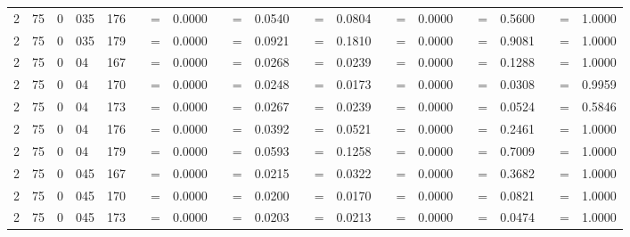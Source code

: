 \begin{tabular*}{260mm}{r@{.}lr@{.}lc|ccc:ccc:ccc:ccc:ccc|ccc}
		2&75	&	0&035	&	176	&	\nicefrac{}{} &=& 0.0000 & 	 &=& 0.0540 & 	 &=& 0.0804 & 	\nicefrac{}{} &=& 0.0000 & 	 &=& 0.5600 & 	 &=& 1.0000 \\ 
		2&75	&	0&035	&	179	&	\nicefrac{}{} &=& 0.0000 & 	 &=& 0.0921 & 	 &=& 0.1810 & 	\nicefrac{}{} &=& 0.0000 & 	 &=& 0.9081 & 	 &=& 1.0000 \\ 
		2&75	&	0&04	&	167	&	\nicefrac{}{} &=& 0.0000 & 	 &=& 0.0268 & 	 &=& 0.0239 & 	\nicefrac{}{} &=& 0.0000 & 	 &=& 0.1288 & 	 &=& 1.0000 \\ 
		2&75	&	0&04	&	170	&	\nicefrac{}{} &=& 0.0000 & 	 &=& 0.0248 & 	 &=& 0.0173 & 	\nicefrac{}{} &=& 0.0000 & 	 &=& 0.0308 & 	 &=& 0.9959 \\ 
		2&75	&	0&04	&	173	&	\nicefrac{}{} &=& 0.0000 & 	 &=& 0.0267 & 	 &=& 0.0239 & 	\nicefrac{}{} &=& 0.0000 & 	 &=& 0.0524 & 	 &=& 0.5846 \\ 
		2&75	&	0&04	&	176	&	\nicefrac{}{} &=& 0.0000 & 	 &=& 0.0392 & 	 &=& 0.0521 & 	\nicefrac{}{} &=& 0.0000 & 	 &=& 0.2461 & 	 &=& 1.0000 \\ 
		2&75	&	0&04	&	179	&	\nicefrac{}{} &=& 0.0000 & 	 &=& 0.0593 & 	 &=& 0.1258 & 	\nicefrac{}{} &=& 0.0000 & 	 &=& 0.7009 & 	 &=& 1.0000 \\ 
		2&75	&	0&045	&	167	&	\nicefrac{}{} &=& 0.0000 & 	 &=& 0.0215 & 	 &=& 0.0322 & 	\nicefrac{}{} &=& 0.0000 & 	 &=& 0.3682 & 	 &=& 1.0000 \\ 
		2&75	&	0&045	&	170	&	\nicefrac{}{} &=& 0.0000 & 	 &=& 0.0200 & 	 &=& 0.0170 & 	\nicefrac{}{} &=& 0.0000 & 	 &=& 0.0821 & 	 &=& 1.0000 \\ 
		2&75	&	0&045	&	173	&	\nicefrac{}{} &=& 0.0000 & 	 &=& 0.0203 & 	 &=& 0.0213 & 	\nicefrac{}{} &=& 0.0000 & 	 &=& 0.0474 & 	 &=& 1.0000 \\ 

\end{tabular*}
